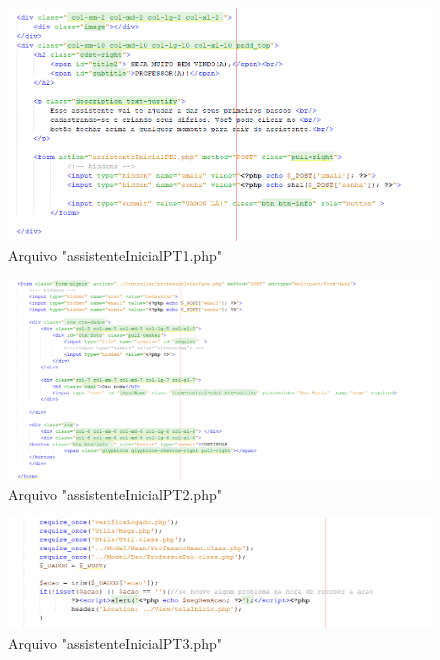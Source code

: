 \begin{figure}[!htb]
	\centering
	\includegraphics[width=0.9\linewidth]{cadastroView1}
	\caption{Arquivo "assistenteInicialPT1.php"}
	\label{fig:cadastroview1}
\end{figure}


\begin{figure}[!htb]
	\centering
	\includegraphics[width=0.9\linewidth]{cadastroView2}
	\caption{Arquivo "assistenteInicialPT2.php"}
	\label{fig:cadastroview2}
\end{figure}

\begin{figure}[!htb]
	\centering
	\includegraphics[width=0.9\linewidth]{cadastroView3}
	\caption{Arquivo "assistenteInicialPT3.php"}
	\label{fig:cadastroview3}
\end{figure}

